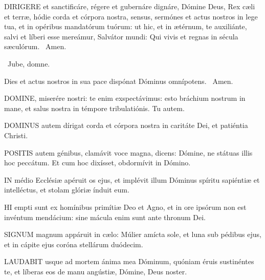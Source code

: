 \lettrine[lines=2]{D}{IRIGERE} et sanctificáre, régere et gubernáre dignáre, Dómine Deus, Rex cæli et terræ, hódie corda et córpora nostra, sensus, sermónes et actus nostros in lege tua, et in opéribus mandatórum tuórum: ut hic, et in ætérnum, te auxiliánte, salvi et líberi esse mereámur, Salvátor mundi: Qui vivis et regnas in sécula sæculórum. \R\ Amen.

\V\ Jube, domne.

 Dies et actus nostros in sua pace dispónat Dóminus omnípotens. \R\ Amen.



\lettrine[lines=2]{D}{OMINE}, miserére nostri: te enim exspectávimus: esto bráchium nostrum in mane, et salus nostra in témpore tribulatiónis. Tu autem.


\lettrine[lines=2]{D}{OMINUS} autem dírigat corda et córpora nostra in caritáte Dei, et patiéntia Christi.



\lettrine[lines=2]{P}{OSITIS} autem génibus, clamávit voce magna, dicens: Dómine, ne státuas illis hoc peccátum. Et cum hoc dixísset, obdormívit in Dómino.


\lettrine[lines=2]{I}{N} médio Ecclésiæ apéruit os ejus, et implévit illum Dóminus spíritu sapiéntiæ et intelléctus, et stolam glóriæ índuit eum.


\lettrine[lines=2]{H}{I} empti sunt ex homínibus primítiæ Deo et Agno, et in ore ipsórum non est invéntum mendácium: sine mácula enim sunt ante thronum Dei.



\lettrine[lines=2]{S}{IGNUM} magnum appáruit in cælo: Múlier amícta sole, et luna sub pédibus ejus, et in cápite ejus coróna stellárum duódecim.


\lettrine[lines=2]{L}{AUDABIT} usque ad mortem ánima mea Dóminum, quóniam éruis sustinéntes te, et líberas eos de manu angústiæ, Dómine, Deus noster.

